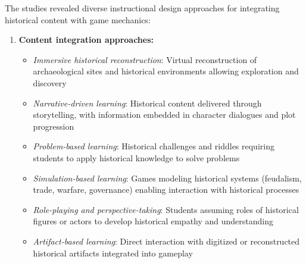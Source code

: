 \documentclass[a4paper,fleqn]{cas-sc}
\begin{document}
The studies revealed diverse instructional design approaches for integrating historical content with game mechanics:

\begin{enumerate}[noitemsep]
	\item 
\textbf{Content integration approaches:}
\begin{itemize}[noitemsep]
 \item \textit{Immersive historical reconstruction}: Virtual reconstruction of archaeological sites and historical environments allowing exploration and discovery \citep{1Barbatsis201159, 14Forsyth2023, 18Shih201054, 20Erandaru2014, 25Repantis2011502, 31DeAmicis2009451, 39Tegos2014838, 48Moketar2021}
 
 \item \textit{Narrative-driven learning}: Historical content delivered through storytelling, with information embedded in character dialogues and plot progression \citep{2Mahamarowi2023133, 5kazanidis2018alpha, 12Gilbert2019108, 15Slater2022, 17Manzanares2019, 47Clara2010156, 55Squire2004, 64Hsu201324, 71lynch2015pedagogical, 80gottlieb2018your}
 
 \item \textit{Problem-based learning}: Historical challenges and riddles requiring students to apply historical knowledge to solve problems \citep{6Czerwinski2018, 9Lin2018, 18Shih201054, 20Erandaru2014, 42Huffer201581, 45Yu2016727, 78Rouse2022357}
 
 \item \textit{Simulation-based learning}: Games modeling historical systems (feudalism, trade, warfare, governance) enabling interaction with historical processes \citep{8Yu2014, 9Lin2018, 20Erandaru2014, 51Ardito2007, 55Squire2004, 74Fendt2019, 75trajano2014using, 76Corbeil2011462}
 
 \item \textit{Role-playing and perspective-taking}: Students assuming roles of historical figures or actors to develop historical empathy and understanding \citep{4Cruz2017, 16Chen201447, 18Shih201054, 29Stiso20201165, 42Huffer201581, 43ali2018indonesian, 45Yu2016727, 48Moketar2021, 60Hoy2018, 64Hsu201324, 71lynch2015pedagogical, 74Fendt2019, 78Rouse2022357, 80gottlieb2018your}
 
 \item \textit{Artifact-based learning}: Direct interaction with digitized or reconstructed historical artifacts integrated into gameplay \citep{1Barbatsis201159, 15Slater2022, 22Nugroho2020149, 32Cheng20241718, 40Kuran2018, 48Moketar2021, 54Gibson2007, 58Shih2015173}
 

\end{itemize}
\end{enumerate}
\end{document}
